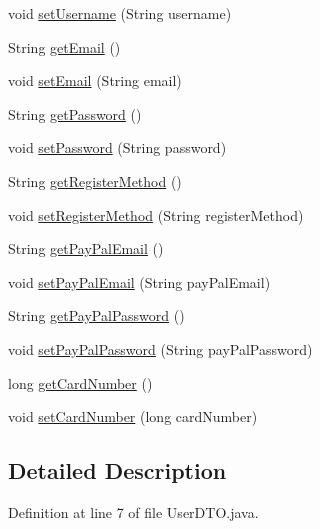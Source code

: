 \begin{DoxyCompactItemize}
\item 
void \mbox{\hyperlink{class_s_p_q_1_1dto_1_1_user_d_t_o_a53003074966a77e89f5900344ab79b15}{set\+Username}} (String username)
\item 
String \mbox{\hyperlink{class_s_p_q_1_1dto_1_1_user_d_t_o_a67038ab8bab7cb7119ece00bcb20a360}{get\+Email}} ()
\item 
void \mbox{\hyperlink{class_s_p_q_1_1dto_1_1_user_d_t_o_a3e41397e229b7f0398232747d97d6d5e}{set\+Email}} (String email)
\item 
String \mbox{\hyperlink{class_s_p_q_1_1dto_1_1_user_d_t_o_a955f436e60336683283a6fcd6fc5f874}{get\+Password}} ()
\item 
void \mbox{\hyperlink{class_s_p_q_1_1dto_1_1_user_d_t_o_a35bd2d50e194e3d923e8adcf229e5a3e}{set\+Password}} (String password)
\item 
String \mbox{\hyperlink{class_s_p_q_1_1dto_1_1_user_d_t_o_ab2180112e27f967d77dd4696f88bd2ef}{get\+Register\+Method}} ()
\item 
void \mbox{\hyperlink{class_s_p_q_1_1dto_1_1_user_d_t_o_a8e4fb216f49f13c196598119a15556ea}{set\+Register\+Method}} (String register\+Method)
\item 
String \mbox{\hyperlink{class_s_p_q_1_1dto_1_1_user_d_t_o_a42f2eecae334e6e937419b1c201cb1f2}{get\+Pay\+Pal\+Email}} ()
\item 
void \mbox{\hyperlink{class_s_p_q_1_1dto_1_1_user_d_t_o_ab166e73261db557f7fce5a47adf955f0}{set\+Pay\+Pal\+Email}} (String pay\+Pal\+Email)
\item 
String \mbox{\hyperlink{class_s_p_q_1_1dto_1_1_user_d_t_o_ab024e5157674f9bc382edfda06c348ec}{get\+Pay\+Pal\+Password}} ()
\item 
void \mbox{\hyperlink{class_s_p_q_1_1dto_1_1_user_d_t_o_afe549d85cf389f5f7aa90eb8a0f1a6d8}{set\+Pay\+Pal\+Password}} (String pay\+Pal\+Password)
\item 
long \mbox{\hyperlink{class_s_p_q_1_1dto_1_1_user_d_t_o_a6ffd8dce998a3e1756aa82e7b2981dd4}{get\+Card\+Number}} ()
\item 
void \mbox{\hyperlink{class_s_p_q_1_1dto_1_1_user_d_t_o_a9f35044d63cd9769575a5ec019dc9cca}{set\+Card\+Number}} (long card\+Number)
\end{DoxyCompactItemize}


\subsection{Detailed Description}


Definition at line 7 of file User\+D\+T\+O.\+java.



